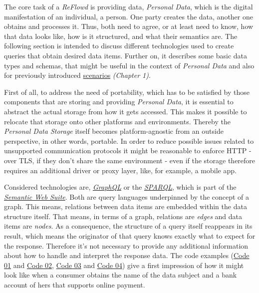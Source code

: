 \documentclass[12pt,english,a4paper,titlepage,cleardoublepage=empty,dottedtoc]{report}
\begin{document}
The core task of a \emph{ReFlowd} is providing data, \emph{Personal
Data}, which is the digital manifestation of an individual, a person.
One party creates the data, another one obtains and processes it. Thus,
both need to agree, or at least need to know, how that data looks like,
how is it structured, and what their semantics are. The following
section is intended to discuss different technologies used to create
queries that obtain desired data items. Further on, it describes some
basic data types and schemas, that might be useful in the context of
\emph{Personal Data} and also for previously introduced
\protect\hyperlink{scenarios}{scenarios} \emph{(Chapter 1)}.

First of all, to address the need of portability, which has to be
satisfied by those components that are storing and providing
\emph{Personal Data}, it is essential to abstract the actual storage
from how it gets accessed. This makes it possible to relocate that
storage onto other platforms and environments. Thereby the
\emph{Personal Data Storage} itself becomes platform-agnostic from an
outside perspective, in other words, portable. In order to reduce
possible issues related to unsupported communication protocols it might
be reasonable to enforce HTTP - over TLS, if they don't share the same
environment - even if the storage therefore requires an additional
driver or proxy layer, like, for example, a mobile app.

Considered technologies are,
\emph{\protect\hyperlink{def--graphql}{GraphQL}} or the
\emph{\protect\hyperlink{def--sparql}{SPARQL}}, which is part of the
\emph{\protect\hyperlink{def--semantic-web}{Semantic Web Suite}}. Both
are query languages underpinned by the concept of a graph. This means,
relations between data items are embedded within the data structure
itself. That means, in terms of a graph, relations are \emph{edges} and
data items are \emph{nodes}. As a consequence, the structure of a query
itself reappears in its result, which means the originator of that query
knows exactly what to expect for the response. Therefore it's not
necessary to provide any additional information about how to handle and
interpret the response data. The code examples
(\protect\hyperlink{code-01_sparql-query}{Code 01} and
\protect\hyperlink{code-02_sparql-query-results}{Code 02},
\protect\hyperlink{code-03_graphql-query}{Code 03} and
\protect\hyperlink{code-04_graphql-query-result}{Code 04}) give a first
impression of how it might look like when a consumer obtains the name of
the data subject and a bank account of hers that supports online
payment.
\end{document}
